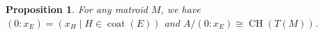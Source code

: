 \documentclass[11pt, reqno]{amsart}
\DeclareMathOperator{\aChow}{CH}             		%
\DeclareMathOperator{\coat}{coat}
\renewcommand{\emptyset}{\varnothing}
\newcommand{\iso}{\cong}
\DeclareMathOperator{\Ker}{Ker}
\renewcommand{\ker}{\Ker}
\newcommand{\QQ}{\mathbb{Q}}
\DeclareMathOperator{\rk}{rk}
\newtheorem{prop}[thm]{Proposition}
\theoremstyle{definition}
\numberwithin{equation}{section}
\numberwithin{table}{section}
\begin{document}
\begin{spacing}{1.1}
\begin{prop} \label{augmented:truncation}
For any matroid $M$, we have $(0 : x_E) = (x_H \mid H \in \coat(E))$ and $A/(0 : x_E) \iso \aChow(T(M))$. 
\end{prop}

%


\end{spacing}
\end{document}

